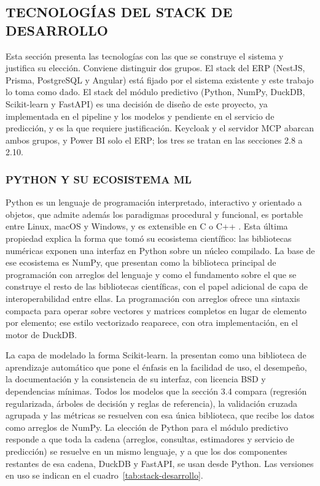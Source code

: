 \subsection{TECNOLOGÍAS DEL STACK DE DESARROLLO}

Esta sección presenta las tecnologías con las que se construye el sistema y justifica su elección. Conviene distinguir dos grupos. El stack del ERP (NestJS, Prisma, PostgreSQL y Angular) está fijado por el sistema existente y este trabajo lo toma como dado. El stack del módulo predictivo (Python, NumPy, DuckDB, Scikit-learn y FastAPI) es una decisión de diseño de este proyecto, ya implementada en el pipeline y los modelos y pendiente en el servicio de predicción, y es la que requiere justificación. Keycloak y el servidor MCP abarcan ambos grupos, y Power BI solo el ERP; los tres se tratan en las secciones 2.8 a 2.10.

\subsubsection{PYTHON Y SU ECOSISTEMA ML}

Python es un lenguaje de programación interpretado, interactivo y orientado a objetos, que admite además los paradigmas procedural y funcional, es portable entre Linux, macOS y Windows, y es extensible en C o C++ \parencite{PythonFAQ}. Esta última propiedad explica la forma que tomó su ecosistema científico: las bibliotecas numéricas exponen una interfaz en Python sobre un núcleo compilado. La base de ese ecosistema es NumPy, que \textcite{Harris2020} presentan como la biblioteca principal de programación con arreglos del lenguaje y como el fundamento sobre el que se construye el resto de las bibliotecas científicas, con el papel adicional de capa de interoperabilidad entre ellas. La programación con arreglos ofrece una sintaxis compacta para operar sobre vectores y matrices completos en lugar de elemento por elemento; ese estilo vectorizado reaparece, con otra implementación, en el motor de DuckDB.

La capa de modelado la forma Scikit-learn. \textcite{Pedregosa2011} la presentan como una biblioteca de aprendizaje automático que pone el énfasis en la facilidad de uso, el desempeño, la documentación y la consistencia de su interfaz, con licencia BSD y dependencias mínimas. Todos los modelos que la sección 3.4 compara (regresión regularizada, árboles de decisión y reglas de referencia), la validación cruzada agrupada y las métricas se resuelven con esa única biblioteca, que recibe los datos como arreglos de NumPy. La elección de Python para el módulo predictivo responde a que toda la cadena (arreglos, consultas, estimadores y servicio de predicción) se resuelve en un mismo lenguaje, y a que los dos componentes restantes de esa cadena, DuckDB y FastAPI, se usan desde Python. Las versiones en uso se indican en el cuadro~\ref{tab:stack-desarrollo}.

